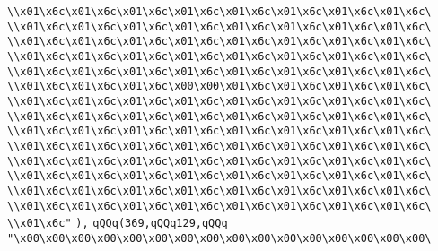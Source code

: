 \verb|\\x01\x6c\x01\x6c\x01\x6c\x01\x6c\x01\x6c\x01\x6c\x01\x6c\x01\x6c\|\newline
\verb|\\x01\x6c\x01\x6c\x01\x6c\x01\x6c\x01\x6c\x01\x6c\x01\x6c\x01\x6c\|\newline
\verb|\\x01\x6c\x01\x6c\x01\x6c\x01\x6c\x01\x6c\x01\x6c\x01\x6c\x01\x6c\|\newline
\verb|\\x01\x6c\x01\x6c\x01\x6c\x01\x6c\x01\x6c\x01\x6c\x01\x6c\x01\x6c\|\newline
\verb|\\x01\x6c\x01\x6c\x01\x6c\x01\x6c\x01\x6c\x01\x6c\x01\x6c\x01\x6c\|\newline
\verb|\\x01\x6c\x01\x6c\x01\x6c\x00\x00\x01\x6c\x01\x6c\x01\x6c\x01\x6c\|\newline
\verb|\\x01\x6c\x01\x6c\x01\x6c\x01\x6c\x01\x6c\x01\x6c\x01\x6c\x01\x6c\|\newline
\verb|\\x01\x6c\x01\x6c\x01\x6c\x01\x6c\x01\x6c\x01\x6c\x01\x6c\x01\x6c\|\newline
\verb|\\x01\x6c\x01\x6c\x01\x6c\x01\x6c\x01\x6c\x01\x6c\x01\x6c\x01\x6c\|\newline
\verb|\\x01\x6c\x01\x6c\x01\x6c\x01\x6c\x01\x6c\x01\x6c\x01\x6c\x01\x6c\|\newline
\verb|\\x01\x6c\x01\x6c\x01\x6c\x01\x6c\x01\x6c\x01\x6c\x01\x6c\x01\x6c\|\newline
\verb|\\x01\x6c\x01\x6c\x01\x6c\x01\x6c\x01\x6c\x01\x6c\x01\x6c\x01\x6c\|\newline
\verb|\\x01\x6c\x01\x6c\x01\x6c\x01\x6c\x01\x6c\x01\x6c\x01\x6c\x01\x6c\|\newline
\verb|\\x01\x6c\x01\x6c\x01\x6c\x01\x6c\x01\x6c\x01\x6c\x01\x6c\x01\x6c\|\newline
\verb|\\x01\x6c"|\newline
\verb|),|\newline
\verb|qQQq(369,qQQq129,qQQq|\newline
\verb|"\x00\x00\x00\x00\x00\x00\x00\x00\x00\x00\x00\x00\x00\x00\x00\x00\|\newline
